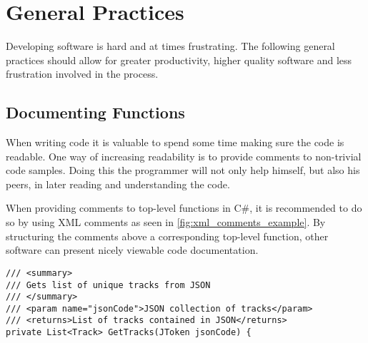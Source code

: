 \section{General Practices}
\label{imp:general_practices}

Developing software is hard and at times frustrating. The following
general practices should allow for greater productivity, higher
quality software and less frustration involved in the process.

\subsection{Documenting Functions}
When writing code it is valuable to spend some time making sure the
code is readable. One way of increasing readability is to provide comments
to non-trivial code samples. Doing this the programmer will not only
help himself, but also his peers, in later reading and understanding the code.

When providing comments to top-level functions in C\#, it is
recommended to do so by using XML comments as seen in
\cref{fig:xml_comments_example}. By structuring the comments above a
corresponding top-level function, other software can present nicely
viewable code documentation.

\begin{lstlisting}[caption = {Example of XML-comments on top of C\# function.}, label={fig:xml_comments_example}]
/// <summary>
/// Gets list of unique tracks from JSON
/// </summary>
/// <param name="jsonCode">JSON collection of tracks</param>
/// <returns>List of tracks contained in JSON</returns>
private List<Track> GetTracks(JToken jsonCode) {
\end{lstlisting}
